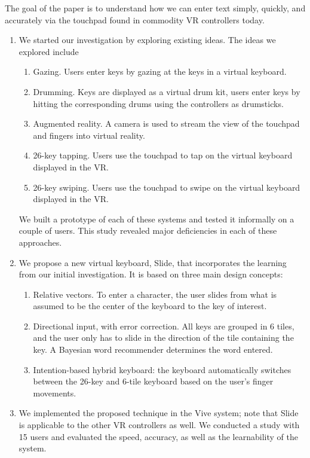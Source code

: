 The goal of the paper is to understand how we can enter text simply, quickly, and accurately via the touchpad found in commodity VR controllers today.  
\begin{enumerate}
\item
We started our investigation by exploring existing ideas.  The ideas we explored include   
\begin{enumerate}
\item
Gazing.  Users enter keys by gazing at the keys in a virtual keyboard. 

\item
Drumming.  Keys are displayed as a virtual drum kit, users enter keys by hitting the corresponding drums using the controllers as drumsticks\cite{Google:VRdrum}. 

\item
Augmented reality.  A camera is used to stream the view of the touchpad and fingers into
virtual reality.  

\item
26-key tapping.  Users use the touchpad to tap on the virtual keyboard displayed in the VR. 

\item
26-key swiping.  Users use the touchpad to swipe on the virtual keyboard displayed in the VR. 
\end{enumerate}
We built a prototype of each of these systems and tested it informally on a couple of users.  This study revealed major deficiencies in each of these approaches.  

\item
We propose a new virtual keyboard, Slide, that incorporates the learning from our initial investigation.  It is based on three main design concepts: 
\begin{enumerate}
\item
Relative vectors.  To enter a character, the user slides from what is assumed to be the center of the keyboard to the key of interest.  

\item
Directional input, with error correction.  All keys are grouped in 6 tiles, and the user only has to slide in the direction of the tile containing the key.  A Bayesian word recommender determines the word entered. 

\item
Intention-based hybrid keyboard: the keyboard automatically switches between the 26-key and 6-tile keyboard based on the user's finger movements.  
\end{enumerate}

\item 
We implemented the proposed technique in the Vive system; note that Slide is applicable to the other VR controllers as well.   We conducted a study with 15 users and evaluated the speed, accuracy, as well as the learnability of the system. 
\end{enumerate}

